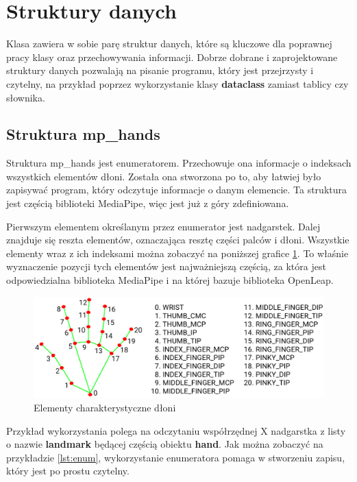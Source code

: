 \section{Struktury danych}

\quad Klasa zawiera w sobie parę struktur danych, które są kluczowe dla poprawnej pracy klasy oraz przechowywania informacji. Dobrze dobrane i zaprojektowane struktury danych pozwalają na pisanie programu, który jest przejrzysty i czytelny, na przykład poprzez wykorzystanie klasy \textbf{dataclass} zamiast tablicy czy słownika. 

\subsection{Struktura mp\_hands}

\quad Struktura mp\_hands jest enumeratorem. Przechowuje ona informacje o indeksach wszystkich elementów dłoni. Została ona stworzona po to, aby łatwiej było zapisywać program, który odczytuje informacje o danym elemencie. Ta struktura jest częścią biblioteki MediaPipe, więc jest już z góry zdefiniowana. 

\quad Pierwszym elementem określanym przez enumerator jest nadgarstek. Dalej znajduje się reszta elementów, oznaczająca resztę części palców i dłoni. Wszystkie elementy wraz z ich indeksami można zobaczyć na poniższej grafice \ref{img:hand_points}. To właśnie wyznaczenie pozycji tych elementów jest najważniejszą częścią, za która jest odpowiedzialna biblioteka MediaPipe i na której bazuje biblioteka OpenLeap. 

\begin{figure}[H]
    \begin{center}
        \includegraphics[width=12.8cm]{../images/hand_landmarks.png}
        \caption{Elementy charakterystyczne dłoni}
        \label{img:hand_points}
    \end{center}
\end{figure}

\quad Przykład wykorzystania polega na odczytaniu współrzędnej X nadgarstka z listy o nazwie \textbf{landmark} będącej częścią obiektu \textbf{hand}. Jak można zobaczyć na przykładzie \ref{lst:enum}, wykorzystanie enumeratora pomaga w stworzeniu zapisu, który jest po prostu czytelny. \newline


